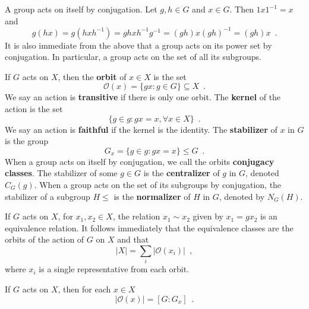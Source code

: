 \begin{example} \cite[122]{DummitFoote2004} A group acts on itself by conjugation. Let $g, h \in G$ and $x \in G$. Then $1 x 1^{-1} = x$ and
$$
g(hx) = g(h x h^{-1}) = gh x h^{-1}g^{-1} = (gh) x (gh)^{-1} = (gh)x \enspace.
$$
It is also immediate from the above that a group acts on its power set by conjugation. In particular, a group acts on the set of all its subgroups.
\end{example}

\begin{definition} \cite[100]{Rotman1967} \cite[112]{DummitFoote2004} If $G$ acts on $X$, then the \textbf{orbit} of $x \in X$ is the set
$$\mathcal{O}(x) = \{ gx : g \in G \} \subseteq X \enspace.
$$
We say an action is \textbf{transitive} if there is only one orbit. The \textbf{kernel} of the action is the set
$$
\{ g \in g : gx = x, \forall x \in X \} \enspace.
$$
We say an action is \textbf{faithful} if the kernel is the identity. The \textbf{stabilizer} of $x$ in $G$ is the group
$$
G_x = \{ g \in g : gx = x \} \leq G \enspace.
$$
When a group acts on itself by conjugation, we call the orbits \textbf{conjugacy classes}. The stabilizer of some $g \in G$ is the \textbf{centralizer} of $g$ in $G$, denoted $C_G(g)$. When a group acts on the set of its subgroups by conjugation, the stabilizer of a subgroup $H \leq$ is the \textbf{normalizer} of $H$ in $G$, denoted by $N_G(H)$.
\end{definition}

\begin{proposition} \cite[102]{Rotman1967} \cite[114]{DummitFoote2004} If $G$ acts on $X$, for $x_1, x_2 \in X$, the relation $x_1 \sim x_2$ given by $x_1 = gx_2$ is an equivalence relation. It follows immediately that the equivalence classes are the orbits of the action of $G$ on $X$ and that
$$
|X| = \sum_i |\mathcal{O}(x_i)| \enspace,
$$
where $x_i$ is a single representative from each orbit.
\end{proposition}

\begin{theorem} \cite[102]{Rotman1967} If $G$ acts on $X$, then for each $x \in X$
$$
|\mathcal{O}(x)| = [G : G_x] \enspace.
$$
\end{theorem}


